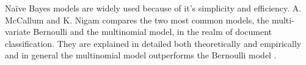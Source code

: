 	Naïve Bayes models are widely used because of it's simplicity and efficiency. A. McCallum and K. Nigam compares the two most common models, the multi-variate Bernoulli and the multinomial model, in the realm of document classification. They are explained in detailed both theoretically and empirically and in general the multinomial model outperforms the Bernoulli model \cite{McCallum98acomparison}.